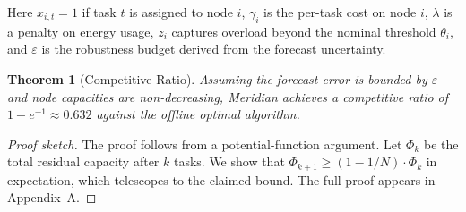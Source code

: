\documentclass[12pt,oneside]{book}
\newtheorem{theorem}{Theorem}[chapter]
\begin{document}
Here \(x_{i,t}=1\) if task \(t\) is assigned to node \(i\), \(\gamma_i\) is the
per-task cost on node \(i\), \(\lambda\) is a penalty on energy usage, \(z_i\)
captures overload beyond the nominal threshold \(\theta_i\), and \(\varepsilon\)
is the robustness budget derived from the forecast uncertainty.

\begin{theorem}[Competitive Ratio]
\label{thm:competitive}
Assuming the forecast error is bounded by \(\varepsilon\) and node capacities
are non-decreasing, Meridian achieves a competitive ratio of
\(1 - e^{-1} \approx 0.632\) against the offline optimal algorithm.
\end{theorem}

\begin{proof}[Proof sketch]
The proof follows from a potential-function argument. Let \(\Phi_k\)
be the total residual capacity after \(k\) tasks. We show that
\(\Phi_{k+1} \geq (1 - 1/N) \cdot \Phi_k\) in expectation, which telescopes
to the claimed bound. The full proof appears in Appendix~A.
\end{proof}
\end{document}
